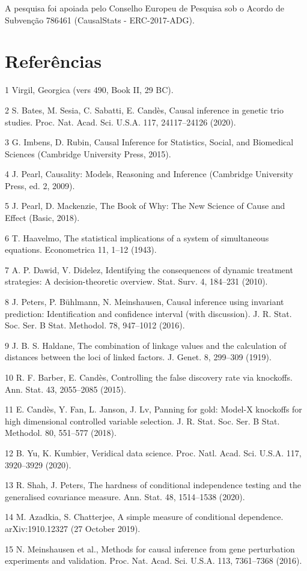      A pesquisa foi apoiada pelo Conselho Europeu de Pesquisa sob o Acordo de Subvenção 786461 (CausalStats - ERC-2017-ADG).

\section*{Referências}

1 Virgil, Georgica (vers 490, Book II, 29 BC).

2 S. Bates, M. Sesia, C. Sabatti, E. Candès, Causal inference in genetic trio studies. Proc. Nat. Acad. Sci. U.S.A. 117, 24117–24126 (2020).

3 G. Imbens, D. Rubin, Causal Inference for Statistics, Social, and Biomedical Sciences (Cambridge University Press, 2015).

4 J. Pearl, Causality: Models, Reasoning and Inference (Cambridge University Press, ed. 2, 2009).

5 J. Pearl, D. Mackenzie, The Book of Why: The New Science of Cause and Effect (Basic, 2018).

6 T. Haavelmo, The statistical implications of a system of simultaneous equations. Econometrica 11, 1–12 (1943).

7 A. P. Dawid, V. Didelez, Identifying the consequences of dynamic treatment strategies: A decision-theoretic overview. Stat. Surv. 4, 184–231 (2010).

8 J. Peters, P. Bühlmann, N. Meinshausen, Causal inference using invariant prediction: Identification and confidence interval (with discussion). J. R. Stat. Soc. Ser. B
Stat. Methodol. 78, 947–1012 (2016).

9 J. B. S. Haldane, The combination of linkage values and the calculation of distances between the loci of linked factors. J. Genet. 8, 299–309 (1919).

10 R. F. Barber, E. Candès, Controlling the false discovery rate via knockoffs. Ann. Stat. 43, 2055–2085 (2015).

11 E. Candès, Y. Fan, L. Janson, J. Lv, Panning for gold: Model-X knockoffs for high dimensional controlled variable selection. J. R. Stat. Soc. Ser. B Stat. Methodol.
80, 551–577 (2018).

12 B. Yu, K. Kumbier, Veridical data science. Proc. Natl. Acad. Sci. U.S.A. 117, 3920–3929 (2020).

13 R. Shah, J. Peters, The hardness of conditional independence testing and the generalised covariance measure. Ann. Stat. 48, 1514–1538 (2020).

14 M. Azadkia, S. Chatterjee, A simple measure of conditional dependence. arXiv:1910.12327 (27 October 2019).

15 N. Meinshausen et al., Methods for causal inference from gene perturbation experiments and validation. Proc. Nat. Acad. Sci. U.S.A. 113, 7361–7368 (2016).
